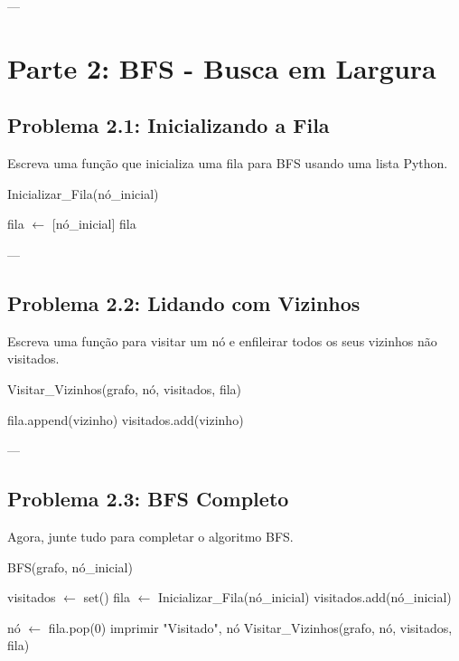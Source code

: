 \documentclass{article}
\begin{document}
---

\section*{Parte 2: BFS - Busca em Largura}

\subsection*{Problema 2.1: Inicializando a Fila}

Escreva uma função que inicializa uma fila para BFS usando uma lista Python.

\begin{algorithm}[H]
\caption{Inicializar\_Fila(nó\_inicial)}
\begin{algorithmic}
    \STATE fila $\gets$ [nó\_inicial] 
    \RETURN fila
\end{algorithmic}
\end{algorithm}

---

\subsection*{Problema 2.2: Lidando com Vizinhos}

Escreva uma função para visitar um nó e enfileirar todos os seus vizinhos não visitados.

\begin{algorithm}[H]
\caption{Visitar\_Vizinhos(grafo, nó, visitados, fila)}
\begin{algorithmic}
            \STATE fila.append(vizinho) 
            \STATE visitados.add(vizinho)
        \ENDIF
    \ENDFOR
\end{algorithmic}
\end{algorithm}

---

\subsection*{Problema 2.3: BFS Completo}

Agora, junte tudo para completar o algoritmo BFS.

\begin{algorithm}[H]
\caption{BFS(grafo, nó\_inicial)}
\begin{algorithmic}
    \STATE visitados $\gets$ set() 
    \STATE fila $\gets$ Inicializar\_Fila(nó\_inicial)
    \STATE visitados.add(nó\_inicial)
    
        \STATE nó $\gets$ fila.pop(0) 
        \STATE imprimir "Visitado", nó
        \STATE Visitar\_Vizinhos(grafo, nó, visitados, fila)
    \ENDWHILE
\end{algorithmic}
\end{algorithm}
\end{document}
